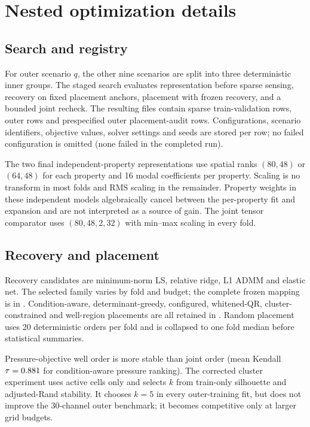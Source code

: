 \section{Nested optimization details}

\subsection{Search and registry}
For outer scenario $q$, the other nine scenarios are split into three deterministic inner groups. The staged search evaluates representation before sparse sensing, recovery on fixed placement anchors, placement with frozen recovery, and a bounded joint recheck. The resulting files contain \OptValidationRecords{} sparse train-validation rows, \OptOuterRecords{} outer rows and \OptPlacementRecords{} prespecified outer placement-audit rows. Configurations, scenario identifiers, objective values, solver settings and seeds are stored per row; no failed configuration is omitted (none failed in the completed run).

The two final independent-property representations use spatial ranks $(80,48)$ or $(64,48)$ for each property and 16 modal coefficients per property. Scaling is no transform in most folds and RMS scaling in the remainder. Property weights in these independent models algebraically cancel between the per-property fit and expansion and are not interpreted as a source of gain. The joint tensor comparator uses $(80,48,2,32)$ with min--max scaling in every fold.

\subsection{Recovery and placement}
Recovery candidates are minimum-norm LS, relative ridge, L1 ADMM and elastic net. The selected family varies by fold and budget; the complete frozen mapping is in . Condition-aware, determinant-greedy, configured, whitened-QR, cluster-constrained and well-region placements are all retained in . Random placement uses 20 deterministic orders per fold and is collapsed to one fold median before statistical summaries.

Pressure-objective well order is more stable than joint order (mean Kendall $\tau=0.881$ for condition-aware pressure ranking). The corrected cluster experiment uses active cells only and selects $k$ from train-only silhouette and adjusted-Rand stability. It chooses $k=5$ in every outer-training fit, but does not improve the 30-channel outer benchmark; it becomes competitive only at larger grid budgets.

